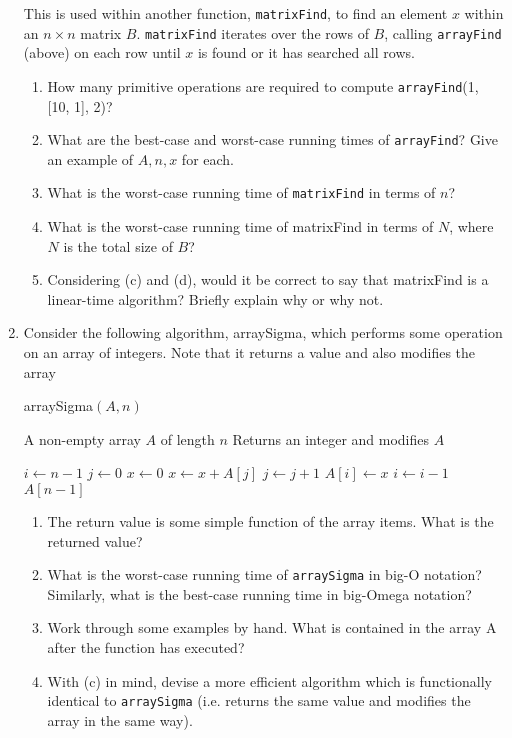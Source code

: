 \begin{enumerate}
    This is used within another function, \texttt{matrixFind}, to find an element $x$ within an $n \times n$ matrix $B$.
    \texttt{matrixFind} iterates over the rows of $B$, calling \texttt{arrayFind} (above) on each row until $x$ is found or it has searched all rows.
    \begin{enumerate}
      \item How many primitive operations are required to compute \texttt{arrayFind}(1, [10, 1], 2)?
      \item What are the best-case and worst-case running times of \texttt{arrayFind}? Give an example of $A, n, x$ for each.
      \item What is the worst-case running time of \texttt{matrixFind} in terms of $n$?
      \item What is the worst-case running time of matrixFind in terms of $N$, where $N$ is the total size of $B$?
      \item Considering (c) and (d), would it be correct to say that matrixFind is a linear-time algorithm? Briefly explain why or why not.
    \end{enumerate}
  \item Consider the following algorithm, arraySigma, which performs some operation on an array of integers. Note that it returns a value and also modifies the array
   
    \begin{algorithm}
    \caption{arraySigma$(A, n)$}
    \begin{algorithmic}[1]
    \REQUIRE A non-empty array $A$ of length $n$
    \ENSURE Returns an integer and modifies $A$

    \STATE $i \leftarrow n - 1$
        \STATE $j \leftarrow 0$
        \STATE $x \leftarrow 0$
            \STATE $x \leftarrow x + A[j]$
            \STATE $j \leftarrow j + 1$
        \ENDWHILE
        \STATE $A[i] \leftarrow x$
        \STATE $i \leftarrow i - 1$
    \ENDWHILE
    \RETURN $A[n - 1]$
    \end{algorithmic}
    \end{algorithm}

    \begin{enumerate}
      \item The return value is some simple function of the array items. What is the returned value?
      \item What is the worst-case running time of \texttt{arraySigma} in big-O notation? Similarly, what is the best-case running time in big-Omega notation?
      \item Work through some examples by hand. What is contained in the array A after the function has executed?
      \item With (c) in mind, devise a more efficient algorithm which is functionally identical to \texttt{arraySigma} (i.e. returns the same value and modifies the array in the same way).
    \end{enumerate}
\end{enumerate}

